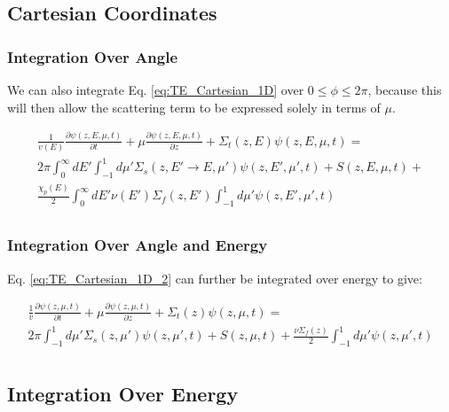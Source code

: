\documentclass[10pt]{article}
\begin{document}
\begin{flushleft}
\subsection{Cartesian Coordinates}

\subsubsection{Integration Over Angle}

We can also integrate Eq. \ref{eq:TE_Cartesian_1D} over \(0\leq \phi \leq 2\pi\), because this will then allow the scattering term to be expressed solely in terms of \(\mu\). 

\begin{equation}
\label{eq:TE_Cartesian_1D_2}
\begin{aligned}
\frac{1}{v(E)} \frac{\partial\psi(z, E, \mu,t)}{\partial t} + \mu \frac{\partial \psi(z, E, \mu,t)}{\partial z} +
 \Sigma_t(z,E)\psi(z, E, \mu,t) =\\
 2\pi \int_{0}^{\infty}dE' \int_{-1}^{1} d\mu' \Sigma_s(z, E'\rightarrow E, \mu')\psi(z, E', \mu',t) + S(z, E, \mu, t)+\\
 \frac{\chi_p(E)}{2} \int_{0}^{\infty} dE'\nu(E')\Sigma_f(z, E')\int_{-1}^{1} d\mu'\psi(z, E', \mu',t)\\
\end{aligned}
\end{equation}

\subsubsection{Integration Over Angle and Energy}
Eq. \eqref{eq:TE_Cartesian_1D_2} can further be integrated over energy to give:

\begin{equation}
\label{eq:TE_Cartesian_1D_2_noenergy}
\begin{aligned}
\frac{1}{v} \frac{\partial\psi(z, \mu,t)}{\partial t} + \mu \frac{\partial \psi(z, \mu,t)}{\partial z} +
 \Sigma_t(z)\psi(z, \mu,t) =\\
 2\pi\int_{-1}^{1} d\mu' \Sigma_s(z, \mu')\psi(z,\mu',t) + S(z, \mu, t)+\frac{\nu\Sigma_f(z)}{2}\int_{-1}^{1} d\mu'\psi(z, \mu',t)\\
\end{aligned}
\end{equation}

\subsection{Integration Over Energy}


\end{flushleft}
\end{document}
